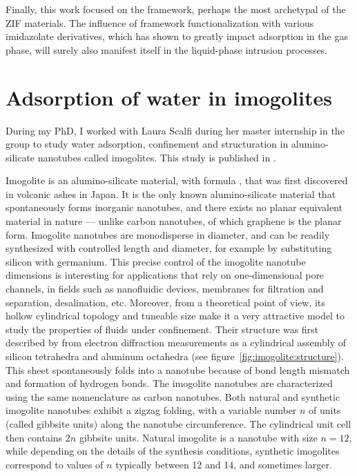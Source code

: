 \documentclass[thesis]{subfiles}
\begin{document}
Finally, this work focused on the  framework, perhaps the most archetypal
of the ZIF materials. The influence of framework functionalization with various
imidazolate derivatives, which has shown to greatly impact adsorption in the gas
phase, will surely also manifest itself in the liquid-phase intrusion processes.

\newpage
\section{Adsorption of water in imogolites}

During my PhD, I worked with Laura Scalfi during her master internship in the
group to study water adsorption, confinement and structuration in
alumino-silicate nanotubes called imogolites. This study is published in
\cite{Scalfi2018}.

Imogolite is an alumino-silicate material, with formula , that
was first discovered in volcanic ashes in Japan\cite{Yoshinaga1962}. It is the
only known alumino-silicate material that spontaneously forms inorganic
nanotubes, and there exists no planar equivalent material in nature --- unlike
carbon nanotubes, of which graphene is the planar form. Imogolite nanotubes are
monodisperse in diameter, and can be readily synthesized with controlled length
and diameter, for example by substituting silicon with
germanium\cite{Amara2013}. This precise control of the imogolite nanotube
dimensions is interesting for applications that rely on one-dimensional pore
channels, in fields such as nanofluidic devices, membranes for filtration and
separation, desalination, etc. Moreover, from a theoretical point of view, its
hollow cylindrical topology and tuneable size make it a very attractive model to
study the properties of fluids under confinement. Their structure was first
described by \citeauthor{Cradwick1972}\cite{Cradwick1972} from electron
diffraction measurements as a cylindrical assembly of silicon tetrahedra and
aluminum octahedra (see figure~\ref{fig:imogolite:structure}). This sheet
spontaneously folds into a nanotube because of bond length mismatch and
formation of hydrogen bonds\cite{Lee2011,Gonzalez2014}. The imogolite nanotubes
are characterized using the same nomenclature as carbon nanotubes. Both natural
and synthetic imogolite nanotubes exhibit a zigzag folding, with a variable
number $n$ of  units (called gibbsite units) along the
nanotube circumference. The cylindrical unit cell then contains $2n$ gibbsite
units. Natural imogolite is a nanotube with size $n=12$, while depending on the
details of the synthesis conditions, synthetic imogolites correspond to values
of $n$ typically between 12 and 14, and sometimes larger.
\end{document}
